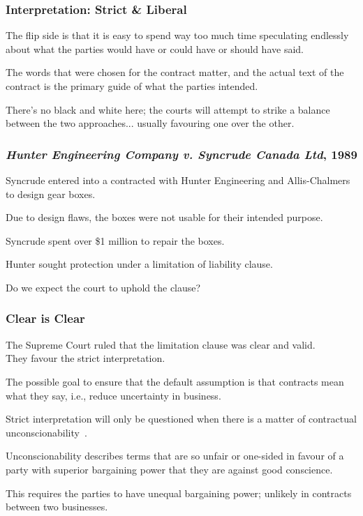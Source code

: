 \begin{frame}
\frametitle{Interpretation: Strict \& Liberal}

The flip side is that it is easy to spend way too much time speculating endlessly about what the parties would have or could have or should have said.

The words that were chosen for the contract matter, and the actual text of the contract is the primary guide of what the parties intended.

There's no black and white here; the courts will attempt to strike a balance between the two approaches... usually favouring one over the other.

\end{frame}



\begin{frame}
\frametitle{\textit{Hunter Engineering Company v. Syncrude Canada Ltd}, 1989}


Syncrude entered into a contracted with Hunter Engineering and Allis-Chalmers to design gear boxes.  

Due to design flaws, the boxes were not usable for their intended purpose.  

Syncrude spent over \$1 million to repair the boxes. 

Hunter sought protection under a limitation of liability clause.

Do we expect the court to uphold the clause?

\end{frame}



\begin{frame}
\frametitle{Clear is Clear}

The Supreme Court  ruled that the limitation clause was clear and valid.\\
\quad They favour the strict interpretation.

The possible goal to ensure that the default assumption is that contracts mean what they say, i.e., reduce uncertainty in business.

Strict interpretation will only be questioned when there is a matter of contractual \alert{unconscionability}~\cite{lpe}.

Unconscionability describes terms that are so unfair or one-sided in favour of a party with superior bargaining power that they are against good conscience.

This requires the parties to have unequal bargaining power; unlikely in contracts between two businesses.
\end{frame}



